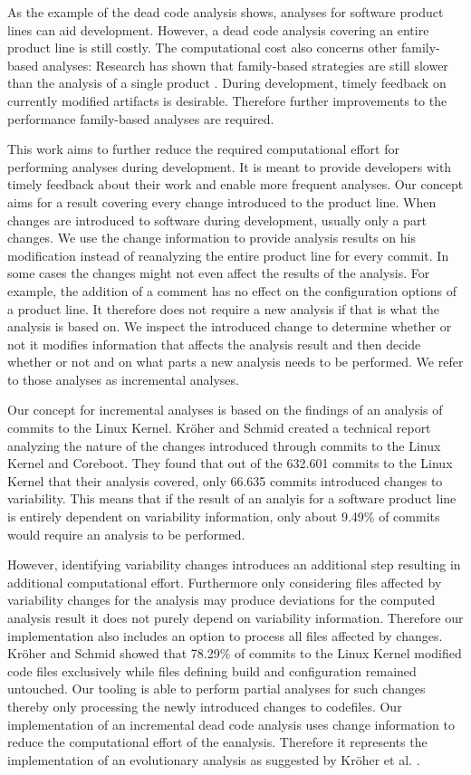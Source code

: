 \documentclass[a4paper]{article}
\begin{document}
As the example of the dead code analysis shows, analyses for software product lines can aid development. However, a dead code analysis covering an entire product line is still costly. The computational cost also concerns other family-based analyses: Research has shown that family-based strategies are still slower than the analysis of a single product \cite{Thum:2014:CSA:2620784.2580950}. During development, timely feedback on currently modified artifacts is desirable. Therefore further improvements to the performance family-based analyses are required.  

This work aims to further reduce the required computational effort for performing analyses during development. It is meant to provide developers with timely feedback about their work and enable more frequent analyses. Our concept aims for a result covering every change introduced to the product line. When changes are introduced to software during development, usually only a part changes. We use the change information to provide analysis results on his modification instead of reanalyzing the entire product line for every commit. In some cases the changes might not even affect the results of the analysis. For example, the addition of a comment has no effect on the configuration options of a product line. It therefore does not require a new analysis if that is what the analysis is based on. We inspect the introduced change to determine whether or not it modifies information that affects the analysis result and then decide whether or not and on what parts a new analysis needs to be performed. We refer to those analyses as incremental analyses.

Our concept for incremental analyses is based on the findings of an analysis of commits to the Linux Kernel. Kr\"oher and Schmid \cite{ComAn} created a technical report analyzing the nature of the changes introduced through commits to the Linux Kernel and Coreboot. They found that out of the 632.601 commits to the Linux Kernel that their analysis covered, only 66.635 commits introduced changes to variability. This means that if the result of an analyis for a software product line is entirely dependent on variability information, only about 9.49\% of commits would require an analysis to be performed. 

However, identifying variability changes introduces an additional step resulting in additional computational effort. Furthermore only considering files affected by variability changes for the analysis may produce deviations for the computed analysis result it does not purely depend on variability information. Therefore our implementation also includes an option to process all files affected by changes.  Kr\"oher and Schmid \cite{ComAn} showed that 78.29\% of commits to the Linux Kernel modified code files exclusively while files defining build and configuration remained untouched. Our tooling is able to perform partial analyses for such changes thereby only processing the newly introduced changes to codefiles.  Our implementation of an incremental dead code analysis uses change information to reduce the computational effort of the eanalysis. Therefore it represents the implementation of an evolutionary analysis as suggested by Kr\"oher et al. \cite{ComAn-splc}. 
\end{document}
